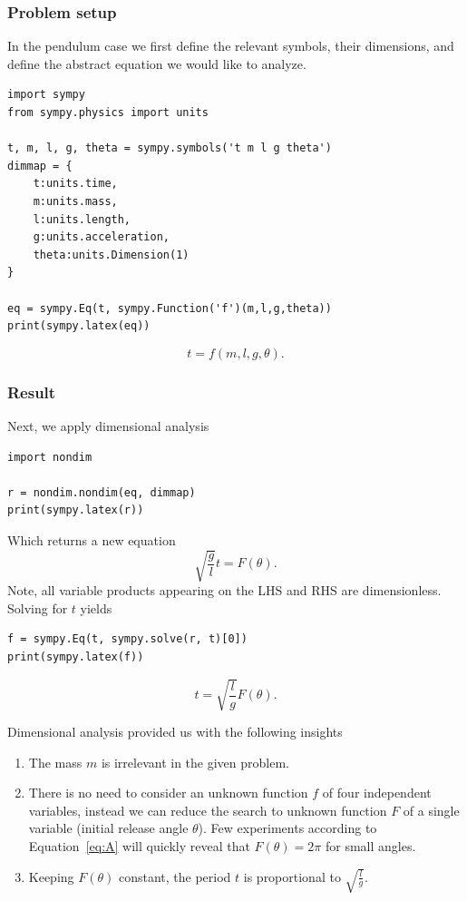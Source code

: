 \documentclass[11pt]{article}
\begin{document}
\subsubsection{Problem setup}
In the pendulum case we first define the relevant symbols, their dimensions, and define the abstract equation we would like to analyze.
\begin{verbatim}
import sympy
from sympy.physics import units

t, m, l, g, theta = sympy.symbols('t m l g theta')
dimmap = {
    t:units.time, 
    m:units.mass, 
    l:units.length, 
    g:units.acceleration, 
    theta:units.Dimension(1)
}

eq = sympy.Eq(t, sympy.Function('f')(m,l,g,theta))
print(sympy.latex(eq))
\end{verbatim}
$$t = f{\left(m,l,g,\theta \right)}.$$

\subsubsection{Result}
Next, we apply dimensional analysis
\begin{verbatim}
import nondim

r = nondim.nondim(eq, dimmap)
print(sympy.latex(r))
\end{verbatim}
Which returns a new equation
\begin{equation}
    \sqrt{\frac{g}{l}}t = F{\left(\theta \right)}. \label{eq:A}
\end{equation} Note, all variable products appearing on the LHS and RHS are dimensionless. Solving for $t$ yields
\begin{verbatim}
f = sympy.Eq(t, sympy.solve(r, t)[0])
print(sympy.latex(f))
\end{verbatim}
$$t = \sqrt{\frac{l}{g}}F{\left(\theta \right)}.$$ 

Dimensional analysis provided us with the following insights
\begin{enumerate}
    \item The mass $m$ is irrelevant in the given problem.
    \item There is no need to consider an unknown function $f$ of four independent variables, instead we can reduce the search to unknown function $F$ of a single variable (initial release angle $\theta$). Few experiments according to Equation~\ref{eq:A} will quickly reveal that $F(\theta)=2\pi$ for small angles.
    \item Keeping $F{\left(\theta \right)}$ constant, the period $t$ is proportional to $\sqrt{\frac{l}{g}}$.
\end{enumerate}
\end{document}
